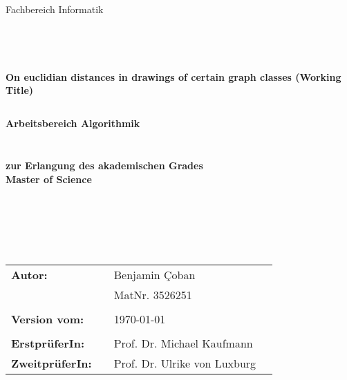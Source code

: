 \begin{center}
\Large{Fachbereich Informatik}
\end{center}
\begin{verbatim}




\end{verbatim}
\begin{center}
\textbf{\LARGE{On euclidian distances in drawings of certain graph classes (Working Title)}}\\
\begin{verbatim}

\end{verbatim}
\textbf{{Arbeitsbereich Algorithmik}}
\end{center}
\begin{verbatim}

\end{verbatim}
\begin{center}

\end{center}
\begin{verbatim}

\end{verbatim}
\begin{center}
\textbf{zur Erlangung des akademischen Grades \\ Master of Science}
\end{center}
\begin{verbatim}






\end{verbatim}
\begin{flushleft}
\begin{tabular}{llll}
\textbf{Autor:} & & Benjamin \c Coban & \\
& & MatNr. 3526251 & \\
& & \\
\textbf{Version vom:} & & \today &\\
& & \\
\textbf{ErstprüferIn:} & & Prof. Dr. Michael Kaufmann &\\
\textbf{ZweitprüferIn:} & & Prof. Dr. Ulrike von Luxburg &\\
\end{tabular}
\end{flushleft}